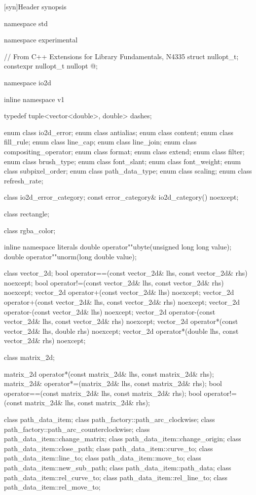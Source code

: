 [syn]{Header  synopsis}

%
\begin{codeblock}

namespace std { namespace experimental {
  // From C++ Extensions for Library Fundamentals, N4335
  struct nullopt_t;
  constexpr nullopt_t nullopt{ @\impdef@ };

  namespace io2d { inline namespace v1 {

  typedef tuple<vector<double>, double> dashes;

  enum class io2d_error;
  enum class antialias;
  enum class content;
  enum class fill_rule;
  enum class line_cap;
  enum class line_join;
  enum class compositing_operator;
  enum class format;
  enum class extend;
  enum class filter;
  enum class brush_type;
  enum class font_slant;
  enum class font_weight;
  enum class subpixel_order;
  enum class path_data_type;
  enum class scaling;
  enum class refresh_rate;

  class io2d_error_category;
  const error_category& io2d_category() noexcept;

  class rectangle;

  class rgba_color;

  inline namespace literals {
    double operator""ubyte(unsigned long long value);
    double operator""unorm(long double value);
  }
  
  class vector_2d;
  bool operator==(const vector_2d& lhs, const vector_2d& rhs) noexcept;
  bool operator!=(const vector_2d& lhs, const vector_2d& rhs) noexcept;
  vector_2d operator+(const vector_2d& lhs) noexcept;
  vector_2d operator+(const vector_2d& lhs, const vector_2d& rhs) noexcept;
  vector_2d operator-(const vector_2d& lhs) noexcept;
  vector_2d operator-(const vector_2d& lhs, const vector_2d& rhs) noexcept;
  vector_2d operator*(const vector_2d& lhs, double rhs) noexcept;
  vector_2d operator*(double lhs, const vector_2d& rhs) noexcept;

  class matrix_2d;

  matrix_2d operator*(const matrix_2d& lhs, const matrix_2d& rhs);
  matrix_2d& operator*=(matrix_2d& lhs, const matrix_2d& rhs);
  bool operator==(const matrix_2d& lhs, const matrix_2d& rhs);
  bool operator!=(const matrix_2d& lhs, const matrix_2d& rhs);

  class path_data_item;
  class path_factory::path_arc_clockwise;
  class path_factory::path_arc_counterclockwise;
  class path_data_item::change_matrix;
  class path_data_item::change_origin;
  class path_data_item::close_path;
  class path_data_item::curve_to;
  class path_data_item::line_to;
  class path_data_item::move_to;
  class path_data_item::new_sub_path;
  class path_data_item::path_data;
  class path_data_item::rel_curve_to;
  class path_data_item::rel_line_to;
  class path_data_item::rel_move_to;

}}}}
\end{codeblock}
